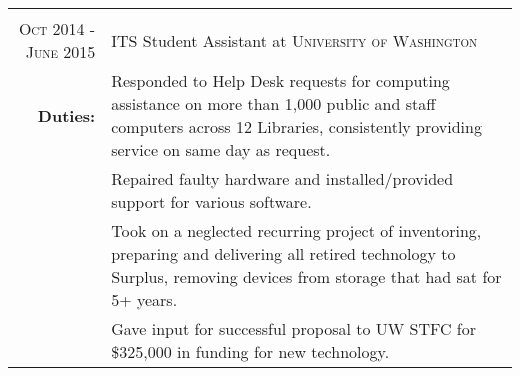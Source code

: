 \documentclass[a4paper,10pt]{article}
\begin{document}
\begin{tabular}{r|p{14cm}}
	\multicolumn{2}{c}{}\\
\textsc{Oct 2014 - June 2015} & ITS Student Assistant at \textsc{University of Washington}\\
	\textbf{Duties:} & \footnotesize{\textbullet Responded to Help Desk requests for computing assistance on more than 1,000 public and staff computers across 12 Libraries, consistently providing service on same day as request.}\\
	& \footnotesize{\textbullet Repaired faulty hardware and installed/provided support for various software.}\\
	& \footnotesize{\textbullet Took on a neglected recurring project of inventoring, preparing and delivering all retired technology to Surplus, removing devices from storage that had sat for 5+ years. }\\
	& \footnotesize{\textbullet Gave input for successful proposal to UW STFC for \$325,000 in funding for new technology.}
\end{tabular}

\end{document}
